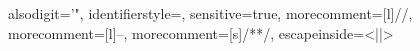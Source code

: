 {    %
    alsodigit={'"},%
    identifierstyle=\color{black!80},%
    sensitive=true,%
    morecomment=[l]{//},%
    morecomment=[l]{--},%
    morecomment=[s]{/*}{*/},%
    escapeinside={<|}{|>}}

\newrobustcmd{}
\newrobustcmd{}
